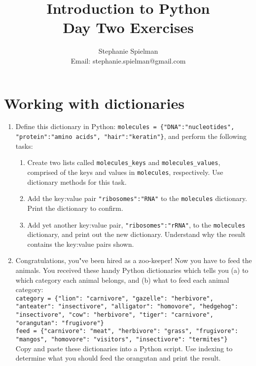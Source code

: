 \documentclass{article}[12pt]
\newcommand{\code}[1]{\texttt{#1}}  %
\begin{document}
\title{Introduction to Python \\ Day Two Exercises}
\author{Stephanie Spielman \\ \footnotesize{Email: stephanie.spielman@gmail.com}}
\date{}
\maketitle{}

\section{Working with dictionaries}

\begin{enumerate}[itemsep=5ex]
	
	\item Define this dictionary in Python: \code{molecules = \{"DNA":"nucleotides", "protein":"amino acids", "hair":"keratin"\}}, and perform the following tasks:
	\begin{enumerate}[itemsep=2ex]
		\item Create two lists called \code{molecules\_keys} and \code{molecules\_values}, comprised of the keys and values in \code{molecules}, respectively. Use dictionary methods for this task.
		\item Add the key:value pair \code{"ribosomes":"RNA"} to the \code{molecules} dictionary. Print the dictionary to confirm.
		\item Add yet another key:value pair, \code{"ribosomes":"rRNA"}, to the \code{molecules} dictionary, and print out the new dictionary. Understand why the result contains the key:value pairs shown.
	\end{enumerate}
	
	
	\item Congratulations, you"ve been hired as a zoo-keeper! Now you have to feed the animals. You received these handy Python dictionaries which tells you (a) to which category each animal belongs, and (b) what to feed each animal category: \\
	
	\code{category = \{"lion": "carnivore", "gazelle": "herbivore", "anteater": "insectivore", "alligator": "homovore", "hedgehog": "insectivore", "cow": "herbivore", "tiger": "carnivore", "orangutan": "frugivore"\}} \\
	
	\code{feed = \{"carnivore": "meat", "herbivore": "grass", "frugivore": "mangos", "homovore": "visitors", "insectivore": "termites"\} } \\
	
	\noindent Copy and paste these dictionaries into a Python script. Use indexing to determine what you should feed the orangutan and print the result.
	

\end{enumerate}
\end{document}
